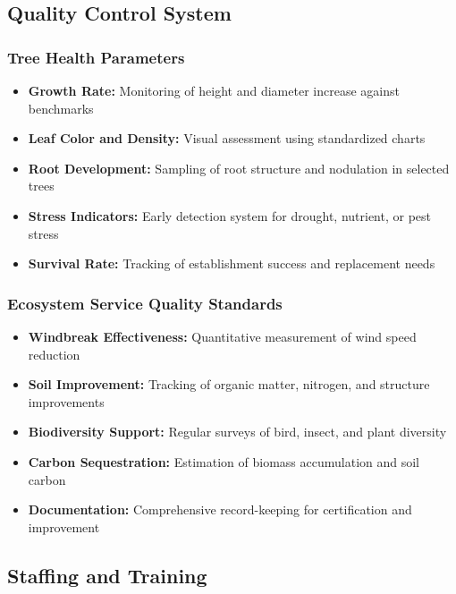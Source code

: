 \subsection{Quality Control System}

\subsubsection{Tree Health Parameters}
\begin{itemize}
    \item \textbf{Growth Rate:} Monitoring of height and diameter increase against benchmarks
    \item \textbf{Leaf Color and Density:} Visual assessment using standardized charts
    \item \textbf{Root Development:} Sampling of root structure and nodulation in selected trees
    \item \textbf{Stress Indicators:} Early detection system for drought, nutrient, or pest stress
    \item \textbf{Survival Rate:} Tracking of establishment success and replacement needs
\end{itemize}

\subsubsection{Ecosystem Service Quality Standards}
\begin{itemize}
    \item \textbf{Windbreak Effectiveness:} Quantitative measurement of wind speed reduction
    \item \textbf{Soil Improvement:} Tracking of organic matter, nitrogen, and structure improvements
    \item \textbf{Biodiversity Support:} Regular surveys of bird, insect, and plant diversity
    \item \textbf{Carbon Sequestration:} Estimation of biomass accumulation and soil carbon
    \item \textbf{Documentation:} Comprehensive record-keeping for certification and improvement
\end{itemize}

\subsection{Staffing and Training}

